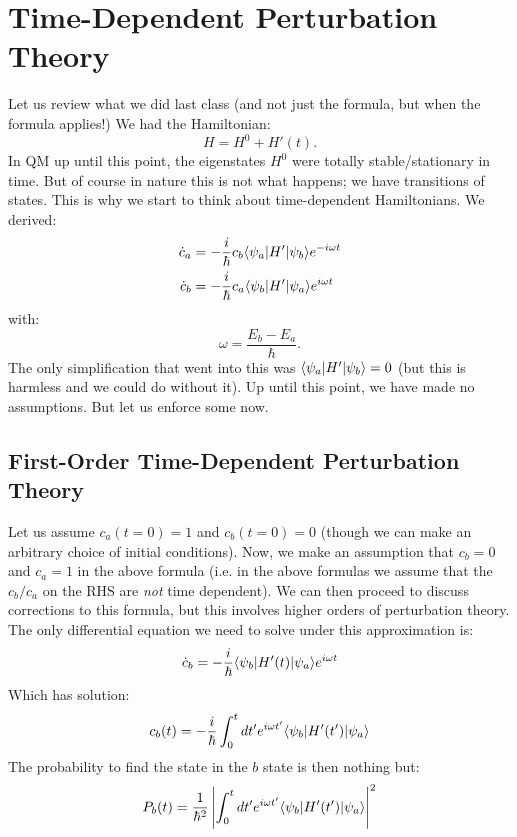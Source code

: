 \section{Time-Dependent Perturbation Theory}
Let us review what we did last class (and not just the formula, but when the formula applies!) We had the Hamiltonian:
\begin{equation}
    H = H^0 + H'(t).
\end{equation}
In QM up until this point, the eigenstates $H^0$ were totally stable/stationary in time. But of course in nature this is not what happens; we have transitions of states. This is why we start to think about time-dependent Hamiltonians. We derived:
\begin{equation}
    \begin{split}
        \dot{c}_a &= -\frac{i}{\hbar}c_b \langle \psi_a \rvert H'\lvert \psi_b \rangle e^{-i\omega t}
        \\ \dot{c}_b &= -\frac{i}{\hbar}c_a \langle \psi_b \rvert H'\lvert \psi_a \rangle e^{i\omega t}
    \end{split}
\end{equation}
with:
\begin{equation}
    \omega = \frac{E_b - E_a}{\hbar}.
\end{equation}
The only simplification that went into this was $\langle \psi_a \rvert H'\lvert \psi_b \rangle = 0$ (but this is harmless and we could do without it). Up until this point, we have made no assumptions. But let us enforce some now.

\subsection{First-Order Time-Dependent Perturbation Theory}
Let us assume $c_a(t = 0) = 1$ and $c_b(t = 0) = 0$ (though we can make an arbitrary choice of initial conditions). Now, we make an assumption that $c_b = 0$ and $c_a = 1$ in the above formula (i.e. in the above formulas we assume that the $c_b/c_a$ on the RHS are \emph{not} time dependent). We can then proceed to discuss corrections to this formula, but this involves higher orders of perturbation theory. The only differential equation we need to solve under this approximation is:
\begin{equation}
    \dot{c}_b = -\frac{i}{\hbar}\langle \psi_b \rvert H'(t)\lvert \psi_a \rangle e^{i\omega t}
\end{equation}
Which has solution:
\begin{equation}
    c_b(t) = -\frac{i}{\hbar}\int_0^t dt' e^{i\omega t'}\langle \psi_b \rvert H'(t')\lvert \psi_a \rangle
\end{equation}
The probability to find the state in the $b$ state is then nothing but:
\begin{equation}
    P_b(t) = \frac{1}{\hbar^2}\left|\int_0^t dt' e^{i\omega t'}\langle \psi_b \rvert H'(t')\lvert \psi_a \rangle\right|^2
\end{equation}

